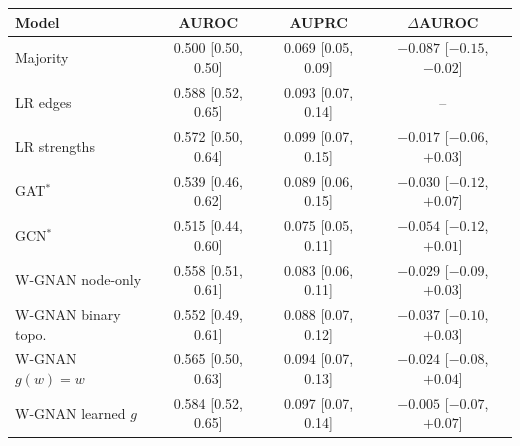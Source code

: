 \begin{tabular}{lccc}
\toprule
Model & AUROC & AUPRC & $\Delta$AUROC \\
\midrule
Majority & 0.500 [0.50, 0.50] & 0.069 [0.05, 0.09] & $-0.087$ [$-0.15$, $-0.02$] \\
LR edges & 0.588 [0.52, 0.65] & 0.093 [0.07, 0.14] & -- \\
LR strengths & 0.572 [0.50, 0.64] & 0.099 [0.07, 0.15] & $-0.017$ [$-0.06$, $+0.03$] \\
GAT$^\ast$ & 0.539 [0.46, 0.62] & 0.089 [0.06, 0.15] & $-0.030$ [$-0.12$, $+0.07$] \\
GCN$^\ast$ & 0.515 [0.44, 0.60] & 0.075 [0.05, 0.11] & $-0.054$ [$-0.12$, $+0.01$] \\
W-GNAN node-only & 0.558 [0.51, 0.61] & 0.083 [0.06, 0.11] & $-0.029$ [$-0.09$, $+0.03$] \\
W-GNAN binary topo. & 0.552 [0.49, 0.61] & 0.088 [0.07, 0.12] & $-0.037$ [$-0.10$, $+0.03$] \\
W-GNAN $g(w)=w$ & 0.565 [0.50, 0.63] & 0.094 [0.07, 0.13] & $-0.024$ [$-0.08$, $+0.04$] \\
W-GNAN learned $g$ & 0.584 [0.52, 0.65] & 0.097 [0.07, 0.14] & $-0.005$ [$-0.07$, $+0.07$] \\
\bottomrule
\end{tabular}
